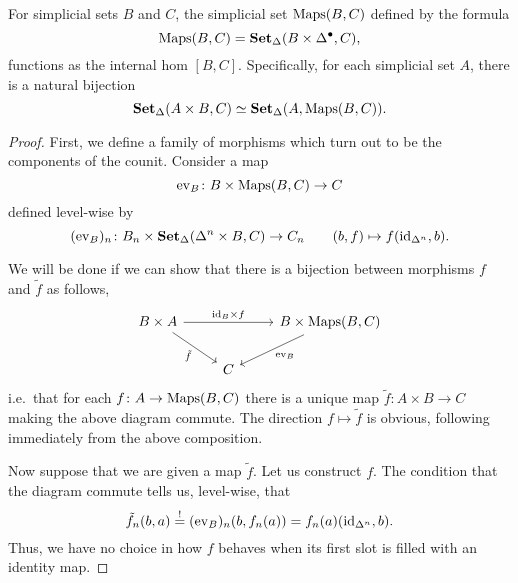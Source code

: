 \documentclass[main.tex]{subfiles}
\begin{document}
\begin{theorem}
  For simplicial sets $B$ and $C$, the simplicial set $\operatorname{Maps}(B, C)$ defined by the formula
  \begin{equation*}
    \operatorname{Maps}(B, C) = \operatorname{\mathbf{Set}_{\Delta}}(B \times \Delta^{\bullet}, C),
  \end{equation*}
  functions as the internal hom $[B, C]$. Specifically, for each simplicial set $A$, there is a natural bijection
  \begin{equation*}
    \operatorname{\mathbf{Set}_{\Delta}}(A \times B, C) \simeq \operatorname{\mathbf{Set}_{\Delta}}(A, \operatorname{Maps}(B, C)).
  \end{equation*}
\end{theorem}
\begin{proof}
  First, we define a family of morphisms which turn out to be the components of the counit. Consider a map
  \begin{equation*}
    \mathrm{ev}_{B}\colon B \times \operatorname{Maps}(B, C) \to C
  \end{equation*}
  defined level-wise by
  \begin{equation*}
    (\mathrm{ev}_{B})_{n}\colon B_{n} \times \operatorname{\mathbf{Set}_{\Delta}}(\Delta^{n} \times B, C) \to C_{n}\qquad (b, f) \mapsto f(\mathrm{id}_{\Delta^{n}}, b).
  \end{equation*}

  We will be done if we can show that there is a bijection between morphisms $f$ and $\tilde{f}$ as follows,
  \begin{equation*}
    \begin{tikzcd}
      B \times A
      \arrow[rr, "\id_{B} \times f"]
      \arrow[dr, swap, "\tilde{f}"]
      && B \times \Maps(B, C)
      \arrow[dl, "\mathrm{ev}_{B}"]
      \\
      & C
    \end{tikzcd}
  \end{equation*}
  i.e.\ that for each $f\colon A \to \operatorname{Maps}(B, C)$ there is a unique map $\tilde{f}\colon A \times B \to C$ making the above diagram commute. The direction $f \mapsto \tilde{f}$ is obvious, following immediately from the above composition.

  Now suppose that we are given a map $\tilde{f}$. Let us construct $f$. The condition that the diagram commute tells us, level-wise, that
  \begin{equation*}
    \tilde{f}_{n}(b, a) \overset{!}{=} (\mathrm{ev}_{B})_{n}(b, f_{n}(a)) = f_{n}(a)(\mathrm{id}_{\Delta^{n}}, b).
  \end{equation*}
  Thus, we have no choice in how $f$ behaves when its first slot is filled with an identity map.
\end{proof}
\end{document}
